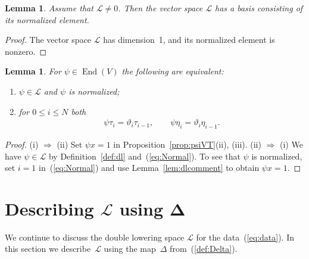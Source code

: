\documentclass[pdftex]{sigma}
\numberwithin{equation}{section}
\newtheorem{Lemma}[Theorem]{Lemma}
\begin{document}
\begin{Lemma}\label{lem:normBasis}
Assume that $\mathcal L\not=0$.
Then the vector space $\mathcal L$ has a basis consisting
of its normalized element.
\end{Lemma}
\begin{proof} The vector space $\mathcal L$ has dimension~1, and
its normalized element is nonzero.
\end{proof}

\begin{Lemma}\label{lem:charNorm}
For $\psi \in \operatorname{End}(V)$ the following
are equivalent:
\begin{enumerate}\itemsep=0pt
\item[$(i)$] $\psi \in \mathcal L$ and $\psi$ is normalized;
\item[$(ii)$] for $0 \leq i \leq N$ both
\begin{gather}
\label{eq:Normal}
\psi \tau_i = \vartheta_i \tau_{i-1}, \qquad \psi \eta_i = \vartheta_i \eta_{i-1}.
\end{gather}
\end{enumerate}
\end{Lemma}
\begin{proof}
(i) $\Rightarrow$ (ii) Set $\psi x=1$
in Proposition~\ref{prop:psiVT}(ii), (iii).
 (ii) $\Rightarrow$ (i) We have $\psi \in \mathcal L$ by
Definition~\ref{def:dl} and~(\ref{eq:Normal}). To see that $\psi$ is normalized, set
$i=1$ in~(\ref{eq:Normal}) and use Lemma~\ref{lem:dlcomment} to obtain
$\psi x =1$.
\end{proof}

\section[Describing L using Delta]{Describing $\boldsymbol{\mathcal L}$ using $\boldsymbol{\Delta}$}\label{section5}

We continue to discuss the double lowering space
$\mathcal L$ for the data~(\ref{eq:data}). In this section we describe~$\mathcal L$ using the map~$\Delta$ from~(\ref{def:Delta}).
\end{document}

